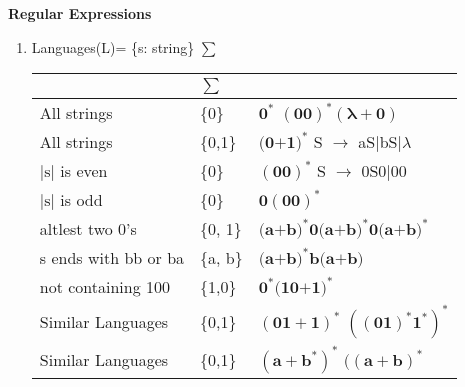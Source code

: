 
\centerline{\textbf{ \LARGE Regular Expressions }}

\begin{enumerate}
    \item Languages(L)= \{s: string\} \(\sum\)

    \begin{myTableStyle} \begin{tabular}{ |m{4cm}|m{1cm}|m{10cm}| } \hline
        & \(\sum\) & \\ \hline
        All strings  &\{0\}
                     & \( \mathbf {0^*} \)  \quad \( \mathbf {(00)^*(\lambda+0)} \)  \\ \hline

        All strings &\{0,1\}
                    & \( \mathbf {\text{(0+1)}^*} \)   \quad S \(\rightarrow\) aS\(|\)bS\(| \lambda \) \\ \hline

         \(\left |\text{s}\right | \)  is even & \{0\}
                        &  \( \mathbf {(00)^*} \) \quad S \(\rightarrow\) 0S0\(|\)00 \\ \hline

        \(   \left | \text{s}  \right | \)  is odd & \{0\} &  \( \mathbf {0(00)^*} \) \\ \hline

        altlest two 0's & \{0, 1\}
                & \( \mathbf { \text{(a+b)}^* \text{0} \text{(a+b)}^* \text{0} \text{(a+b)}^*} \) \\ \hline

        s ends with bb or ba & \{a, b\}
                             & \( \mathbf { \text{(a+b)}^* \text{b} \text{(a+b)} } \)  \\\hline

        not containing 100 & \{1,0\}
                                      & \( \mathbf { \text{0}^*\text{(10+1)}^* } \) \\\hline

        Similar Languages  &\{0,1\}
                           & \( \mathbf {(01 + 1)^*} \) \quad \( \mathbf {((01)^*1^*)^*} \) \\ \hline

        Similar Languages  &\{0,1\}
                           & \( \mathbf {(a + b^*)^*} \) \quad \( \mathbf {((a+b)^*} \) \\ \hline

    \end{tabular} \end{myTableStyle} \vspace{0.08in}


\end{enumerate}
